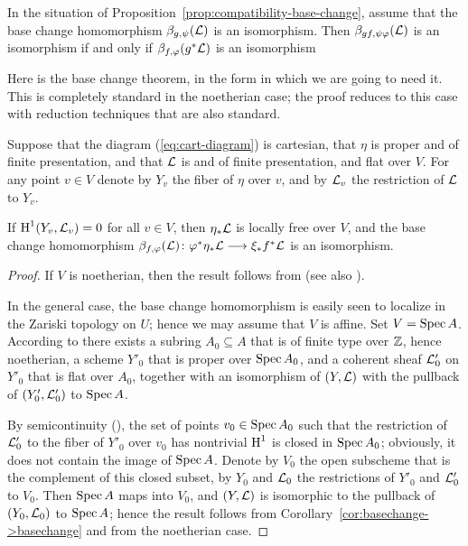 \begin{4   STACKS}
\begin{4.3 Descent for morphisms of schemes}
\begin{corollary}\label{cor:basechange->basechange}
In the situation of Proposition~\ref{prop:compatibility-base-change}, assume that the base change homomorphism $\beta_{g, \psi}(\mathcal{L})$ is an isomorphism. Then $\beta_{gf, \psi\varphi}(\mathcal{L})$ is an isomorphism if and only if $\beta_{f, \varphi}(g^*\mathcal{L})$ is an isomorphism
\end{corollary}

Here is the base change theorem, in the form in which we are going to need it. This is completely standard in the noetherian case; the proof reduces to this case with reduction techniques that are also standard.

\begin{proposition}
Suppose that the diagram (\ref{eq:cart-diagram}) is cartesian, that $\eta$ is proper and of finite presentation, and that $\mathcal{L}$ is \qc and of finite presentation, and flat over $V$. For any point $v \in V$ denote by $Y_v$ the fiber of $\eta$ over $v$, and by $\mathcal{L}_v$ the restriction of $\mathcal{L}$ to $Y_v$.

If $\operatorname{H}^1(Y_v, \mathcal{L}_v) = 0$ for all $v \in V$, then $\eta_*\mathcal{L}$ is locally free over $V$, and the base change homomorphism $\beta_{f, \phi}(\cL) \colon \phi^*\eta_*\cL \arr \xi_* f ^* \cL$ is an isomorphism.
\end{proposition}


\begin{proof}
If $V$ is noetherian, then the result follows from \cite[7.7]{ega3-2} (see also \cite[III 12]{hartshorne}).

In the general case, the base change homomorphism is easily seen to localize in the Zariski topology on $U$; hence we may assume that $V$ is affine. Set $V = \operatorname{Spec} A$. According to \cite[Proposition 8.9.1, Th\'eor\`eme 8.10.5 and Th\'eor\`eme~11.2.6]{ega4-3} there exists a subring $A_0 \subseteq A$ that is of finite type over $\mathbb{Z}$, hence noetherian, a scheme $Y'_0$ that is proper over $\operatorname{Spec} A_0$, and a coherent sheaf $\mathcal{L}'_0$ on $Y'_0$ that is flat over $A_0$, together with an isomorphism of $(Y, \mathcal{L})$ with the pullback of $(Y'_0, \mathcal{L}'_0)$ to $\operatorname{Spec} A$.

By semicontinuity (\cite[Th\'eor\`eme~7.6.9]{ega3-2}), the set of points $v_0 \in \operatorname{Spec} A_0$ such that the restriction of $\mathcal{L}'_0$ to the fiber of $Y'_0$ over $v_0$ has nontrivial $\operatorname{H}^1$ is closed in $\operatorname{Spec} A_0$; obviously, it does not contain the image of $\operatorname{Spec} A$. Denote by $V_0$ the open subscheme that is the complement of this closed subset, by $Y_0$ and $\mathcal{L}_0$ the restrictions of $Y'_0$ and $\mathcal{L}'_0$ to $V_0$. Then $\operatorname{Spec} A$ maps into $V_0$, and $(Y, \mathcal{L})$ is isomorphic to the pullback of $(Y_0, \mathcal{L}_0)$ to $\operatorname{Spec} A$; hence the result follows from Corollary~\ref{cor:basechange->basechange} and from the noetherian case.
\end{proof}




\end{4.3 Descent for morphisms of schemes}
\end{4   STACKS}
